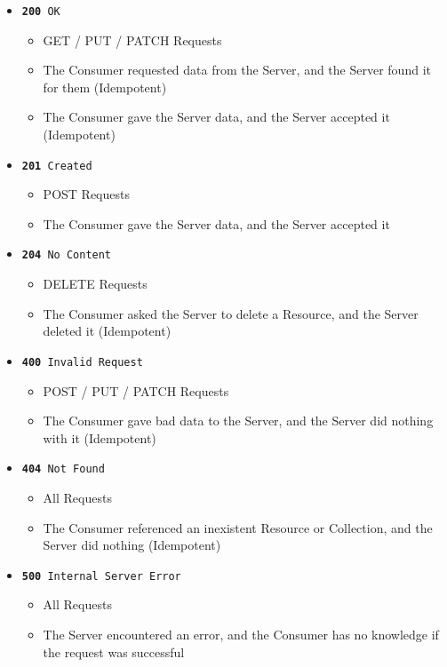 \documentclass{book}
\begin{document}
\begin{itemize}
\item \texttt{\textbf{200} OK}
    \begin{itemize}
    \item GET / PUT / PATCH  Requests
    \item The Consumer requested data from the Server, and the Server found it for them (Idempotent)
    \item The Consumer gave the Server data, and the Server accepted it (Idempotent)
    \end{itemize}
\item \texttt{\textbf{201} Created}
    \begin{itemize}
    \item POST Requests
    \item The Consumer gave the Server data, and the Server accepted it
    \end{itemize}
\item \texttt{\textbf{204} No Content}
    \begin{itemize}
    \item DELETE Requests
    \item The Consumer asked the Server to delete a Resource, and the Server deleted it (Idempotent)
    \end{itemize}
\item \texttt{\textbf{400} Invalid Request}
    \begin{itemize}
    \item POST / PUT / PATCH Requests
    \item The Consumer gave bad data to the Server, and the Server did nothing with it (Idempotent)
    \end{itemize}
\item \texttt{\textbf{404} Not Found}
    \begin{itemize}
    \item All Requests
    \item The Consumer referenced an inexistent Resource or Collection, and the Server did nothing (Idempotent)
    \end{itemize}
\item \texttt{\textbf{500} Internal Server Error}
    \begin{itemize}
    \item All Requests
    \item The Server encountered an error, and the Consumer has no knowledge if the request was successful
    \end{itemize}
\end{itemize}
\end{document}
